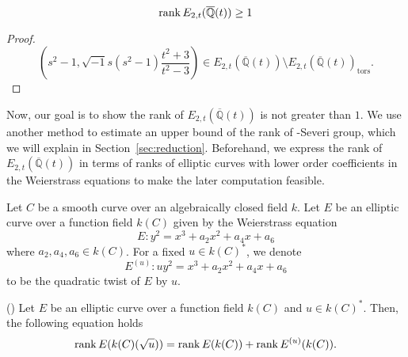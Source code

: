 \documentclass[main]{subfiles}
\begin{document}
\begin{lem}
    \begin{equation*}
        \operatorname{rank} E_{2,t}(\overline{\mathbb{Q}}(t)) \geq 1
    \end{equation*}
\end{lem}
\begin{proof}
    \begin{equation*}
        \left(s^{2} - 1, \sqrt{-1} s(s^{2} - 1) \frac{t^{2} + 3}{t^{2} - 3} \right) \in E_{2,t}(\overline{\mathbb{Q}}(t)) \setminus E_{2,t}(\overline{\mathbb{Q}}(t))_{\text{tors}}.
    \end{equation*}
\end{proof}
Now, our goal is to show the rank of $E_{2,t}(\overline{\mathbb{Q}}(t))$ is not greater than $1$.
We use another method to estimate an upper bound of the rank of \Neron-Severi group, which we will explain in Section~\ref{sec:reduction}.
Beforehand, we express the rank of $E_{2,t}(\overline{\mathbb{Q}}(t))$ in terms of ranks of elliptic curves with lower order coefficients in the Weierstrass equations to make the later computation feasible.

\begin{dfn}
    Let $C$ be a smooth curve over an algebraically closed field $k$.
    Let $E$ be an elliptic curve over a function field $k(C)$ given by the Weierstrass equation
    \begin{equation*}
        E: y^{2} = x^{3} + a_{2} x^{2} + a_{4} x + a_{6}
    \end{equation*}
    where $a_{2}, a_{4}, a_{6} \in k(C)$.
    For a fixed $u \in k(C)^*$, we denote
    \begin{equation*}
        E^{(u)}: u y^{2} = x^{3} + a_{2} x^{2} + a_{4} x + a_{6}
    \end{equation*}
    to be the quadratic twist of $E$ by $u$.
\end{dfn}

\begin{thm}{(\cite[Exercise 10.16]{ref:aec})}
    \label{thm:twist}
    Let $E$ be an elliptic curve over a function field $k(C)$ and $u \in k(C)^*$.
    Then, the following equation holds
    \begin{equation*}
        \operatorname{rank} E(k(C)(\sqrt{u})) = \operatorname{rank} E(k(C)) + \operatorname{rank} E^{(u)}(k(C)).
    \end{equation*}
\end{thm}
\end{document}
